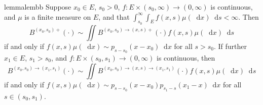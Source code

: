 \documentclass[reqno,draft]{amsart}
\numberwithin{equation}{section}
\theoremstyle{plain}
\newtheorem{lemma}[theorem]{Lemma}
\theoremstyle{remark}
\newcommand*\diff{\mathop{}\!\mathrm{d}}
\begin{document}
\begin{restatable}{lemma}{lembb}\label{lem:bb}
    Suppose $x_0\in E$, $s_0 > 0$, $f\colon E \times (s_0,\infty) \to (0,\infty)$ is continuous, and $\mu$ is a finite measure on $E$, and that $\int_{s_0}^\infty \int_E f(x,s) \mu(\diff x) \diff s < \infty$. Then \[
        B^{(x_0,s_0)+}(\cdot ) \sim \iint B^{(x_0,s_0)\to(x,s)+}(\cdot ) f(x,s) \mu(\diff x) \diff s
    \] if and only if $f(x,s) \mu(\diff x) \sim p_{s-s_0}(x-x_0) \diff x$ for all $s > s_0$. If further $x_1\in E$, $s_1 > s_0$, and $f\colon E\times (s_0,s_1) \to (0,\infty)$ is continuous, then \[
    B^{(x_0,s_0)\to (x_1,s_1)}(\cdot ) \sim \iint B^{(x_0,s_0) \to (x,s)\to(x_1,s_1)}(\cdot ) f(x,s) \mu(\diff x) \diff s
\] if and only if $f(x,s) \mu(\diff x) \sim p_{s-s_0}(x-x_0) p_{s_1-s}(x_1-x) \diff x$ for all $s\in (s_0,s_1)$.
\end{restatable}
\end{document}
